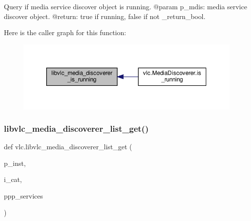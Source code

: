 \begin{DoxyVerb}Query if media service discover object is running.
@param p_mdis: media service discover object.
@return: true if running, false if not \libvlc_return_bool.
\end{DoxyVerb}
 Here is the caller graph for this function\+:
\nopagebreak
\begin{figure}[H]
\begin{center}
\leavevmode
\includegraphics[width=350pt]{namespacevlc_a67f645168455fbbbb9199ff602583113_icgraph}
\end{center}
\end{figure}
\mbox{\label{namespacevlc_ad4eb84abb29b0c9c742ce5444bb21d69}} 
\subsubsection{\texorpdfstring{libvlc\+\_\+media\+\_\+discoverer\+\_\+list\+\_\+get()}{libvlc\_media\_discoverer\_list\_get()}}
{\footnotesize\ttfamily def vlc.\+libvlc\+\_\+media\+\_\+discoverer\+\_\+list\+\_\+get (\begin{DoxyParamCaption}\item[{}]{p\+\_\+inst,  }\item[{}]{i\+\_\+cat,  }\item[{}]{ppp\+\_\+services }\end{DoxyParamCaption})}

